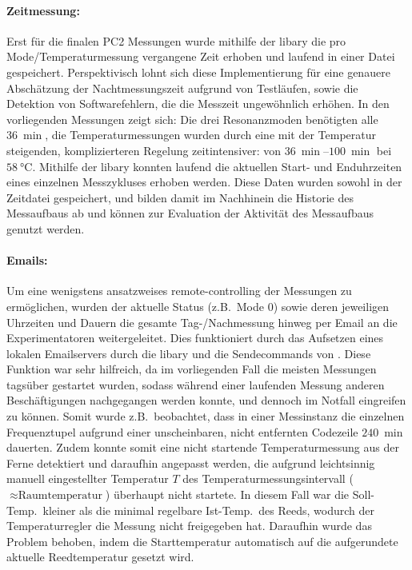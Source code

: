 \documentclass[11pt,a4paper]{article}
\newcommand{\libary}[1]{\textcolor{libarygreen}{\texttt{\detokenize{#1}}}}
\begin{document}
\paragraph{Zeitmessung:} Erst für die finalen PC2 Messungen wurde mithilfe der \libary{time.perf_counter} libary die pro Mode/Temperaturmessung vergangene Zeit erhoben und laufend in einer Datei gespeichert. Perspektivisch lohnt sich diese Implementierung für eine genauere Abschätzung der Nachtmessungszeit aufgrund von Testläufen, sowie die Detektion von Softwarefehlern, die die Messzeit ungewöhnlich erhöhen. In den vorliegenden Messungen zeigt sich: Die drei Resonanzmoden benötigten alle \(\qty{36}{\min}\), die Temperaturmessungen wurden durch eine mit der Temperatur steigenden, komplizierteren Regelung zeitintensiver: von \(\qtyrange{36}{100}{\min}\) bei \(\qty{58}{\degreeCelsius}\). Mithilfe der \libary{datetime} libary konnten laufend die aktuellen Start- und Enduhrzeiten eines einzelnen Messzykluses erhoben werden. Diese Daten wurden sowohl in der Zeitdatei gespeichert, und bilden damit im Nachhinein die Historie des Messaufbaus ab und können zur Evaluation der Aktivität des Messaufbaus genutzt werden. 

\paragraph{Emails:} Um eine wenigstens ansatzweises remote-controlling der Messungen zu ermöglichen, wurden der aktuelle Status (z.B.\ Mode 0) sowie deren jeweiligen Uhrzeiten und Dauern die gesamte Tag-/Nachmessung hinweg per Email an die Experimentatoren weitergeleitet. Dies funktioniert durch das Aufsetzen eines lokalen Emailservers durch die libary \libary{smtplib} und die Sendecommands von \libary{email.message}. Diese Funktion war sehr hilfreich, da im vorliegenden Fall die meisten Messungen tagsüber gestartet wurden, sodass während einer laufenden Messung anderen Beschäftigungen nachgegangen werden konnte, und dennoch im Notfall eingreifen zu können. Somit wurde z.B.\ beobachtet, dass in einer Messinstanz die einzelnen Frequenztupel aufgrund einer unscheinbaren, nicht entfernten Codezeile \(\qty{240}{\min}\) dauerten. Zudem konnte somit eine nicht startende Temperaturmessung aus der Ferne detektiert und daraufhin angepasst werden, die aufgrund leichtsinnig manuell eingestellter Temperatur \(T\) des Temperaturmessungsintervall (\(\approx \text{Raumtemperatur}\)) überhaupt nicht startete. In diesem Fall war die Soll-Temp.\ kleiner als die minimal regelbare Ist-Temp.\ des Reeds, wodurch der Temperaturregler die Messung nicht freigegeben hat. Daraufhin wurde das Problem behoben, indem die Starttemperatur automatisch auf die aufgerundete aktuelle Reedtemperatur gesetzt wird. 
\end{document}
